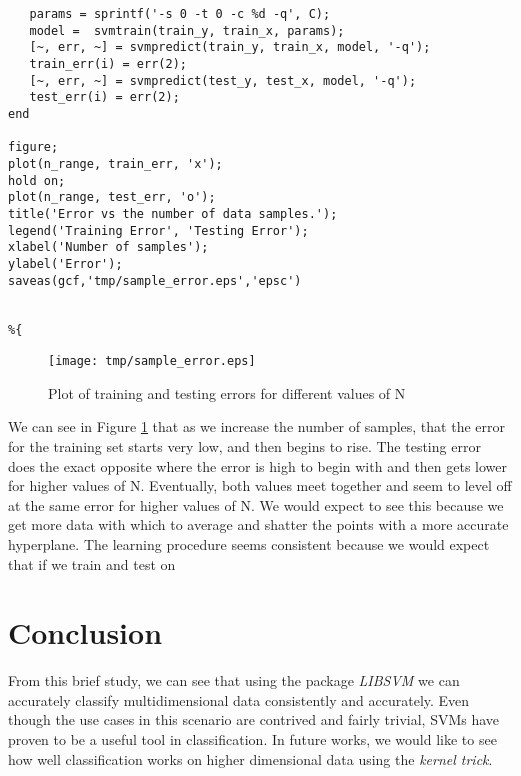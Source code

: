 \documentclass[11pt, twoside]{article}   	%
\begin{document}
\begin{itemize}
\begin{lstlisting}
   params = sprintf('-s 0 -t 0 -c %d -q', C); 
   model =  svmtrain(train_y, train_x, params);
   [~, err, ~] = svmpredict(train_y, train_x, model, '-q'); 
   train_err(i) = err(2); 
   [~, err, ~] = svmpredict(test_y, test_x, model, '-q');
   test_err(i) = err(2); 
end

figure; 
plot(n_range, train_err, 'x'); 
hold on; 
plot(n_range, test_err, 'o'); 
title('Error vs the number of data samples.'); 
legend('Training Error', 'Testing Error'); 
xlabel('Number of samples'); 
ylabel('Error'); 
saveas(gcf,'tmp/sample_error.eps','epsc')


%{
\end{lstlisting}

\begin{figure}[h]
\centering
\texttt{[image: tmp/sample\_error.eps]}
\caption{Plot of training and testing errors for different values of N}
\label{fig:n_errors} 
\end{figure}

We can see in Figure \ref{fig:n_errors} that as we increase the number of
samples, that the error for the training set starts very low, and then begins to rise. The testing
error does the exact opposite where the error is high to begin with and then gets lower for higher
values of N. Eventually, both values meet together and seem to level off at the same error for higher values of N.
We would expect to see this because we
get more data with which to average and shatter the points with a more
accurate hyperplane. The learning procedure seems consistent because we would expect that if we train
and test on 
\end{itemize}

\section{Conclusion}
From this brief study, we can see that using the package \textit{LIBSVM} we can accurately classify multidimensional 
data consistently and accurately. Even though the use cases in this scenario are contrived and fairly trivial, SVMs
have proven to be a useful tool in classification. In future works, we would like to see how well classification works on 
higher dimensional data using the \textit{kernel trick}.
\end{document}
